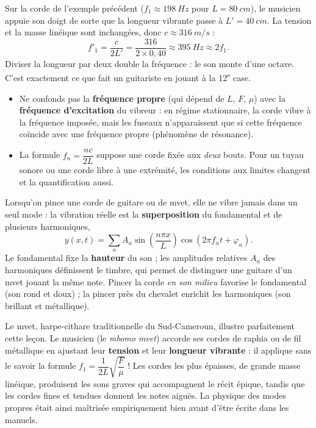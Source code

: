 \documentclass[11pt]{article}
\newcommand{\cle}[1]{{\popxbold\color{popdark}#1}}
\newcounter{popsec}
\newcounter{popsub}
\newcommand{\courssub}[1]{%
  \stepcounter{popsub}%
  \par\vspace{9pt}\noindent{\popxbold\fontsize{11.5}{13}\selectfont\color{popink}{\color{poporange}\thepopsec.\thepopsub}\hspace{6pt}#1}\par\nopagebreak\vspace{4pt}
}
\begin{document}
\begin{exemplebox}
Sur la corde de l'exemple précédent ($f_1 \approx \SI{198}{Hz}$ pour $L = \SI{80}{cm}$), le musicien appuie son doigt de sorte que la longueur vibrante passe à $L' = \SI{40}{cm}$. La tension et la masse linéique sont inchangées, donc $c \approx \SI{316}{m/s}$ :
\[
f'_1 = \frac{c}{2L'} = \frac{316}{2 \times {0,40}} \approx \SI{395}{Hz} \approx 2 f_1.
\]
Diviser la longueur par deux double la fréquence : le son monte d'une octave. C'est exactement ce que fait un guitariste en jouant à la 12\textsuperscript{e} case.
\end{exemplebox}

\begin{attention}
\begin{itemize}
\item Ne confonds pas la \textbf{fréquence propre} (qui dépend de $L$, $F$, $\mu$) avec la \textbf{fréquence d'excitation} du vibreur : en régime stationnaire, la corde vibre à la fréquence imposée, mais les fuseaux n'apparaissent que si cette fréquence coïncide avec une fréquence propre (phénomène de \cle{résonance}).
\item La formule $f_n = \dfrac{nc}{2L}$ suppose une corde fixée aux \emph{deux} bouts. Pour un tuyau sonore ou une corde libre à une extrémité, les conditions aux limites changent et la quantification aussi.
\end{itemize}
\end{attention}

\courssub{Complément Bac : du fondamental au timbre}

\begin{aretenir}
Lorsqu'on pince une corde de guitare ou de mvet, elle ne vibre jamais dans un seul mode : la vibration réelle est la \textbf{superposition} du fondamental et de plusieurs harmoniques,
\[
y(x,t) = \sum_{n} A_n \sin\!\left(\frac{n\pi x}{L}\right) \cos(2\pi f_n t + \varphi_n).
\]
Le fondamental fixe la \textbf{hauteur} du son ; les amplitudes relatives $A_n$ des harmoniques définissent le \cle{timbre}, qui permet de distinguer une guitare d'un mvet jouant la même note. Pincer la corde \emph{en son milieu} favorise le fondamental (son rond et doux) ; la pincer près du chevalet enrichit les harmoniques (son brillant et métallique).
\end{aretenir}

\begin{savaistu}
Le \cle{mvet}, harpe-cithare traditionnelle du Sud-Cameroun, illustre parfaitement cette leçon. Le musicien (le \emph{mbomo mvet}) accorde ses cordes de raphia ou de fil métallique en ajustant leur \textbf{tension} et leur \textbf{longueur vibrante} : il applique sans le savoir la formule $f_1 = \dfrac{1}{2L}\sqrt{\dfrac{F}{\mu}}$ ! Les cordes les plus épaisses, de grande masse linéique, produisent les sons graves qui accompagnent le récit épique, tandis que les cordes fines et tendues donnent les notes aiguës. La physique des modes propres était ainsi maîtrisée empiriquement bien avant d'être écrite dans les manuels.
\end{savaistu}
\end{document}
